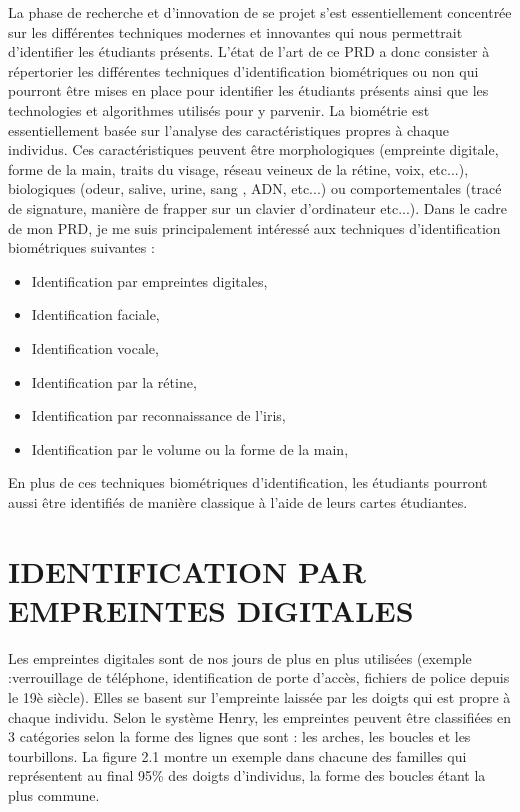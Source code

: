 \documentclass[overfullbox]{polytech/polytech}
\begin{document}
La phase de recherche et d'innovation de se projet s'est essentiellement concentrée sur les différentes techniques modernes et innovantes qui nous permettrait d'identifier les étudiants présents. 
L'état de l'art de ce PRD  a donc consister à répertorier les différentes techniques d'identification biométriques ou non qui pourront être mises en place pour identifier les étudiants présents ainsi que les technologies et algorithmes utilisés pour y parvenir. 
\newline
\newline
 La biométrie est essentiellement basée sur l'analyse des caractéristiques propres à chaque individus. Ces caractéristiques peuvent être morphologiques (empreinte digitale, forme de la main, traits du visage, réseau veineux de la rétine, voix, etc...), biologiques (odeur, salive, urine, sang , ADN, etc...) ou comportementales (tracé de signature, manière de frapper sur un clavier d'ordinateur etc...).
\newline
\newline
Dans le cadre de mon PRD, je me suis principalement intéressé aux techniques d'identification biométriques suivantes : 
\newline
 \begin{itemize}
 \item Identification par empreintes digitales, 
 \item Identification faciale,
 \item Identification vocale,
 \item Identification par la rétine,
 \item Identification par reconnaissance de l'iris,
 \item Identification par le volume ou la forme de la main,
\newline
 \end{itemize}
 
En plus de ces techniques biométriques d'identification, les étudiants pourront aussi être identifiés de manière classique à l'aide de leurs cartes étudiantes.

\section{IDENTIFICATION PAR EMPREINTES DIGITALES}

Les empreintes digitales sont de nos jours de plus en plus utilisées (exemple :verrouillage de téléphone, identification de porte d'accès, fichiers de police depuis le 19è siècle). Elles se basent sur l'empreinte laissée par les doigts qui est propre à chaque individu. 
\newline  
Selon le système Henry, les empreintes peuvent être classifiées en 3 catégories selon la forme des lignes que sont : les arches, les boucles et les tourbillons. La figure 2.1 montre un exemple dans chacune des familles qui représentent au final 95\% des doigts d'individus, la forme des boucles étant la plus commune. 
\end{document}
